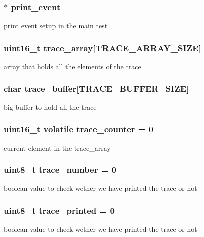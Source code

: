 \subsubsection{$\ast$ {\bf print\_\-event}}\label{trace_8c_51abdaff62ed7e507e74802d6aaad2f0}


print event setup in the main test 
\subsubsection{\setlength{\rightskip}{0pt plus 5cm}uint16\_\-t {\bf trace\_\-array}[TRACE\_\-ARRAY\_\-SIZE]}\label{trace_8c_fb05ce03fd88ea913cbebf4b58a8fa2b}


array that holds all the elements of the trace 
\subsubsection{\setlength{\rightskip}{0pt plus 5cm}char {\bf trace\_\-buffer}[TRACE\_\-BUFFER\_\-SIZE]}\label{trace_8c_b7bfb292d50c2c89dee19b9cd80a8891}


big buffer to hold all the trace 
\subsubsection{\setlength{\rightskip}{0pt plus 5cm}uint16\_\-t volatile {\bf trace\_\-counter} = 0}\label{trace_8c_2aa4c615e99964581e11d1aa748ebe6d}


current element in the trace\_\-array 
\subsubsection{\setlength{\rightskip}{0pt plus 5cm}uint8\_\-t {\bf trace\_\-number} = 0}\label{trace_8c_9956ad8517da46daf23843392127b8de}


boolean value to check wether we have printed the trace or not 
\subsubsection{\setlength{\rightskip}{0pt plus 5cm}uint8\_\-t {\bf trace\_\-printed} = 0}\label{trace_8c_4340f9bf037fd35ca7677d875113fff1}


boolean value to check wether we have printed the trace or not 